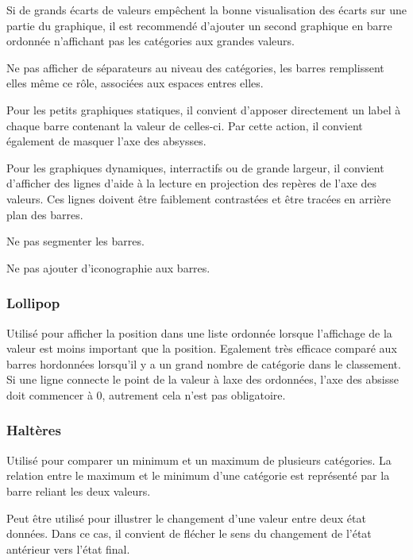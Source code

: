 \documentclass[a4paper,12pt]{article}
\begin{document}
\begin{multicols}{2}
Si de grands écarts de valeurs empêchent la bonne visualisation des écarts sur une partie du graphique, il est recommendé d'ajouter un second graphique en barre ordonnée n'affichant pas les catégories aux grandes valeurs. \autocite{jonathanschwabishComparingCategories2021}

Ne pas afficher de séparateurs au niveau des catégories, les barres remplissent elles même ce rôle, associées aux espaces entres elles. \autocite{jonathanschwabishComparingCategories2021}

Pour les petits graphiques statiques, il convient d'apposer directement un label à chaque barre contenant la valeur de celles-ci. Par cette action, il convient également de masquer l'axe des absysses. \autocite{jonathanschwabishComparingCategories2021}

Pour les graphiques dynamiques, interractifs ou de grande largeur, il convient d'afficher des lignes d'aide à la lecture en projection des repères de l'axe des valeurs. Ces lignes doivent être faiblement contrastées et être tracées en arrière plan des barres. \autocite{jonathanschwabishComparingCategories2021}

Ne pas segmenter les barres. \autocite{jonathanschwabishComparingCategories2021}

Ne pas ajouter d'iconographie aux barres. \autocite{tranDiscoveringAccessibleData2024}
\subsubsection{Lollipop}
\label{sec:orgb9be152}
Utilisé pour afficher la position dans une liste ordonnée lorsque l'affichage de la valeur est moins important que la position. \autocite{alansmithLexiqueVisuel} Egalement très efficace comparé aux barres hordonnées lorsqu'il y a un grand nombre de catégorie dans le classement. \autocite{mikeyiHowChooseRight2020}  Si une ligne connecte le point de la valeur à laxe des ordonnées, l'axe des absisse doit commencer à 0, autrement cela n'est pas obligatoire.
\subsubsection{Haltères}
\label{sec:orgeb724ef}
Utilisé pour comparer un minimum et un maximum de plusieurs catégories. \autocite{alansmithLexiqueVisuel} La relation entre le maximum et le minimum d'une catégorie est représenté par la barre reliant les deux valeurs. \autocite{mikeyiHowChooseRight2020}

Peut être utilisé pour illustrer le changement d'une valeur entre deux état données. Dans ce cas, il convient de flécher le sens du changement de l'état antérieur vers l'état final.


\end{multicols}
\end{document}
